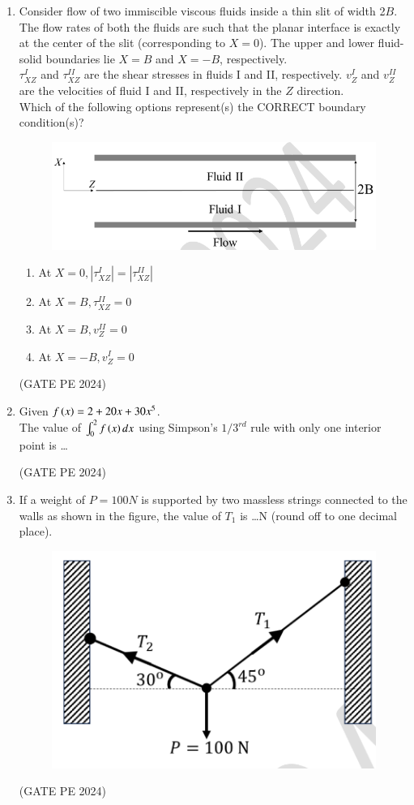 \documentclass[journal,12pt,onecolumn]{IEEEtran}
\theoremstyle{remark}
\begin{document}
\begin{enumerate}
\item Consider flow of two immiscible viscous fluids inside a thin slit of width 2$B$. The flow rates of both the fluids are such that the planar interface is exactly at the center of the slit (corresponding to $X=0$). The upper and lower fluid-solid boundaries lie $X=B$ and $X=-B$, respectively.\\
$\tau^I_{XZ}$ and $\tau^{II}_{XZ}$ are the shear stresses in fluids I and II, respectively. $v^I_Z$ and $v^{II}_Z$ are the velocities of fluid I and II, respectively in the $Z$ direction.\\
Which of the following options represent(s) the CORRECT boundary condition(s)?
\begin{figure}[H]
    \centering
    \includegraphics[width=0.5\columnwidth]{LQ_51.png}
    \caption{}
    \label{fig:placeholder}
\end{figure}
\begin{enumerate}
    \item At $X=0,|\tau^I_{XZ}|=|\tau^{II}_{XZ}|$
    \item At $X=B, \tau^{II}_{XZ}=0$
    \item At $X=B, v^{II}_Z=0$
    \item At $X=-B, v^I_Z=0$
\end{enumerate}
\hfill{(GATE PE 2024)}

\item Given $f\left(x\right)=2+20x+30x^5$.\\
The value of $\int_0^2f\left(x\right)dx$ using Simpson's $1/3^{rd}$ rule with only one interior point is \dots

\hfill{(GATE PE 2024)}

\item If a weight of $P=100N$ is supported by two massless strings connected to the walls as shown in the figure, the value of $T_1$ is \dots N (round off to one decimal place).
\begin{figure}[H]
    \centering
    \includegraphics[width=0.5\columnwidth]{LQ_53.png}
    \caption{}
    \label{fig:placeholder}
\end{figure}
\hfill{(GATE PE 2024)}


\end{enumerate}
\end{document}
